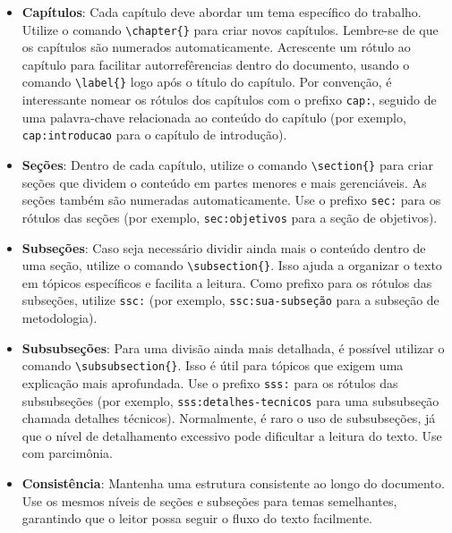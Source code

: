 \begin{itemize}
    \item \textbf{Capítulos}: Cada capítulo deve abordar um tema específico do trabalho. Utilize o
          comando \verb|\chapter{}| para criar novos capítulos. Lembre-se de que os capítulos são numerados
          automaticamente. Acrescente um rótulo ao capítulo para facilitar autorrefêrencias dentro do
          documento, usando o comando \verb|\label{}| logo após o título do capítulo. Por convenção, é
          interessante nomear os rótulos dos capítulos com o prefixo \texttt{cap:}, seguido de uma
          palavra-chave relacionada ao conteúdo do capítulo (por exemplo, \texttt{cap:introducao} para o
          capítulo de introdução).
    \item \textbf{Seções}: Dentro de cada capítulo, utilize o comando \verb|\section{}| para criar
          seções que dividem o conteúdo em partes menores e mais gerenciáveis. As seções também são
          numeradas automaticamente. Use o prefixo \texttt{sec:} para os rótulos das seções (por exemplo,
          \texttt{sec:objetivos} para a seção de objetivos).
    \item \textbf{Subseções}: Caso seja necessário dividir ainda mais o conteúdo dentro de uma seção,
          utilize o comando \verb|\subsection{}|. Isso ajuda a organizar o texto em tópicos específicos e
          facilita a leitura. Como prefixo para os rótulos das subseções, utilize \texttt{ssc:} (por exemplo,
          \texttt{ssc:sua-subseção} para a subseção de metodologia).
    \item \textbf{Subsubseções}: Para uma divisão ainda mais detalhada, é possível utilizar o comando
          \verb|\subsubsection{}|. Isso é útil para tópicos que exigem uma explicação mais aprofundada. Use o
          prefixo \texttt{sss:} para
          os rótulos das subsubseções (por exemplo, \texttt{sss:detalhes-tecnicos} para uma subsubseção
          chamada detalhes técnicos). Normalmente, é raro o uso de subsubseções, já que o nível de detalhamento
          excessivo pode dificultar a leitura do texto. Use com parcimônia.
    \item \textbf{Consistência}: Mantenha uma estrutura consistente ao longo do documento. Use os mesmos
          níveis de seções e subseções para temas semelhantes, garantindo que o leitor possa seguir o fluxo
          do texto facilmente.
\end{itemize}

